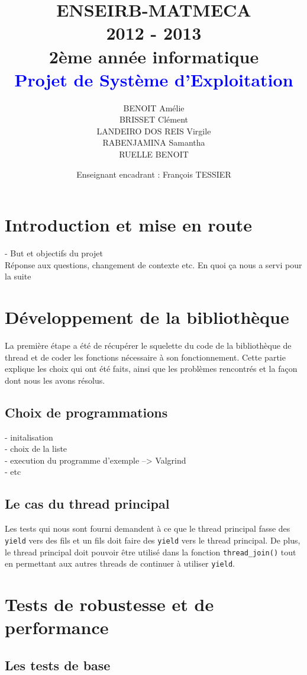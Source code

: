 \documentclass[a4paper,12pt]{article}
\title{
	\normalsize{ENSEIRB-MATMECA \\ 
	2012 - 2013 \\
	2ème année informatique} \\
	\vspace{15mm}
	\Huge{\textcolor{blue}{Projet de Système d'Exploitation }}
}
\author{ BENOIT Amélie \\ BRISSET Clément \\ LANDEIRO DOS REIS Virgile \\ RABENJAMINA Samantha \\ RUELLE BENOIT}
\date{
	\normalsize{Enseignant encadrant : François TESSIER}
}
\begin{document}
\maketitle

\clearpage

\section{Introduction et mise en route}

- But et objectifs du projet \\

Réponse aux questions, changement de contexte etc.
En quoi ça nous a servi pour la suite

\section{Développement de la bibliothèque}
La première étape a été de récupérer le squelette du code de la bibliothèque de thread et de coder les fonctions nécessaire à son fonctionnement. Cette partie explique les choix qui ont été faits, ainsi que les problèmes rencontrés et la façon dont nous les avons résolus.
\subsection{Choix de programmations}
- initalisation \\
- choix de la liste \\
- execution du programme d'exemple --> Valgrind\\
- etc

\subsection{Le cas du thread principal}

Les tests qui nous sont fourni demandent à ce que le thread principal fasse
des \verb!yield! vers des fils et un fils doit faire des \verb!yield! vers le
thread principal. De plus, le thread principal doit pouvoir être utilisé dans
la fonction \verb!thread_join()! tout en permettant aux autres threads de
continuer à utiliser \verb!yield!.

\section{Tests de robustesse et de performance}
\subsection{Les tests de base}
\end{document}
